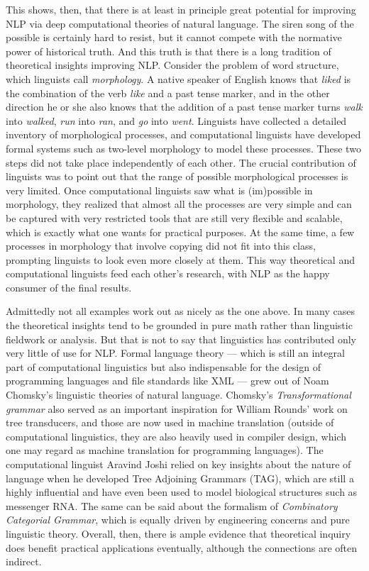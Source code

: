 This shows, then, that there is at least in principle great potential for improving NLP via deep computational theories of natural language.
The siren song of the possible is certainly hard to resist, but it cannot compete with the normative power of historical truth.
And this truth is that there is a long tradition of theoretical insights improving NLP\@.
Consider the problem of word structure, which linguists call \emph{morphology}.
A native speaker of English knows that \emph{liked} is the combination of the verb \emph{like} and a past tense marker, and in the other direction he or she also knows that the addition of a past tense marker turns \emph{walk} into \emph{walked}, \emph{run} into \emph{ran}, and \emph{go} into \emph{went}.
Linguists have collected a detailed inventory of morphological processes, and computational linguists have developed formal systems such as two-level morphology to model these processes. 
These two steps did not take place independently of each other.
The crucial contribution of linguists was to point out that the range of possible morphological processes is very limited.
Once computational linguists saw what is (im)possible in morphology, they realized that almost all the processes are very simple and can be captured with very restricted tools that are still very flexible and scalable, which is exactly what one wants for practical purposes.
At the same time, a few processes in morphology that involve copying did not fit into this class, prompting linguists to look even more closely at them.
This way theoretical and computational linguists feed each other's research, with NLP as the happy consumer of the final results.

Admittedly not all examples work out as nicely as the one above.
In many cases the theoretical insights tend to be grounded in pure math rather than linguistic fieldwork or analysis.
But that is not to say that linguistics has contributed only very little of use for NLP.
Formal language theory --- which is still an integral part of computational linguistics but also indispensable for the design of programming languages and file standards like XML --- grew out of Noam Chomsky's linguistic theories of natural language.
Chomsky's \emph{Transformational grammar} also served as an important inspiration for William Rounds' work on tree transducers, and those are now used in machine translation (outside of computational linguistics, they are also heavily used in compiler design, which one may regard as machine translation for programming languages).
The computational linguist Aravind Joshi relied on key insights about the nature of language when he developed Tree Adjoining Grammars (TAG), which are still a highly influential and have even been used to model biological structures such as messenger RNA\@.
The same can be said about the formalism of \emph{Combinatory Categorial Grammar}, which is equally driven by engineering concerns and pure linguistic theory.
Overall, then, there is ample evidence that theoretical inquiry does benefit practical applications eventually, although the connections are often indirect.

